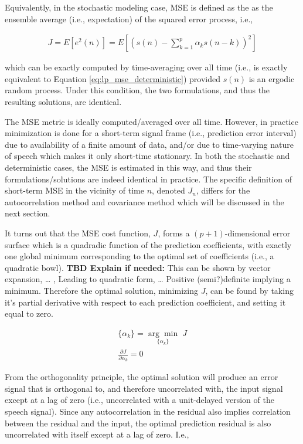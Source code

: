 Equivalently, in the stochastic modeling case, MSE is defined as the as the ensemble average (i.e., expectation) of the squared error process, i.e.,

\begin{eqnarray}
	J = E \left[ e^2(n) \right] = E\left[ \left(s(n)  - \sum_{k=1}^{p}\alpha_k s(n-k) \right) ^2\right]
\end{eqnarray}

\noindent
which can be exactly computed by time-averaging over all time (i.e., is exactly equivalent to Equation \ref{eq:lp_mse_deterministic}) provided $s(n)$ is an ergodic random process. Under this condition, the two formulations, and thus the resulting solutions, are identical.

The MSE metric is ideally computed/averaged over all time. However, in practice minimization is done for a short-term signal frame (i.e., prediction error interval) due to availability of a finite amount of data, and/or due to time-varying nature of speech which makes it only short-time stationary. In both the stochastic and deterministic cases, the MSE is estimated in this way, and thus their formulations/solutions are indeed identical in practice. The specific definition of short-term MSE in the vicinity of time $n$, denoted $J_n$, differs for the autocorrelation method and covariance method which will be discussed in the next section.

It turns out that the MSE cost function, $J$, forms a $(p+1)$-dimensional error surface which is a quadradic function of the prediction coefficients, with exactly one global minimum corresponding to the optimal set of coefficients (i.e., a quadratic bowl). \textbf{TBD Explain if needed:} This can be shown by vector expansion, … , Leading to quadratic form, … Positive (semi?)definite implying a minimum. Therefore the optimal solution, minimizing $J$, can be found by taking it's partial derivative with respect to each prediction coefficient, and setting it equal to zero.

\begin{eqnarray}
	\{\alpha_k\} = \underset{\{\alpha_k\}}{\arg\min} \; J \\
	\frac{\partial J}{\partial \alpha_k}=0
\end{eqnarray}

From the orthogonality principle, the optimal solution will produce an error signal that is orthogonal to, and therefore uncorrelated with, the input signal except at a lag of zero (i.e., uncorrelated with a unit-delayed version of the speech signal). Since any autocorrelation in the residual also implies correlation between the residual and the input, the optimal prediction residual is also uncorrelated with itself except at a lag of zero. I.e.,

